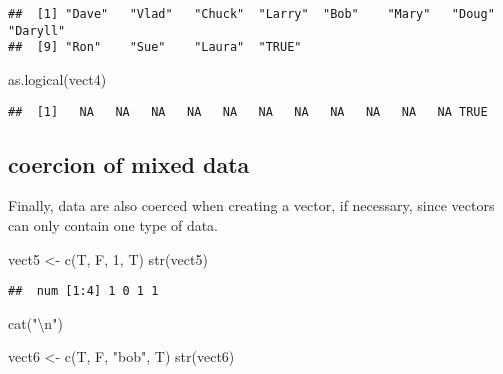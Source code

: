 \documentclass[
]{article}
\newenvironment{Shaded}{\begin{snugshade}}{\end{snugshade}}
\newcommand{\DecValTok}[1]{\textcolor[rgb]{0.00,0.00,0.81}{#1}}
\newcommand{\FunctionTok}[1]{\textcolor[rgb]{0.00,0.00,0.00}{#1}}
\newcommand{\NormalTok}[1]{#1}
\newcommand{\OtherTok}[1]{\textcolor[rgb]{0.56,0.35,0.01}{#1}}
\newcommand{\SpecialCharTok}[1]{\textcolor[rgb]{0.00,0.00,0.00}{#1}}
\newcommand{\StringTok}[1]{\textcolor[rgb]{0.31,0.60,0.02}{#1}}
\begin{document}
\begin{verbatim}
##  [1] "Dave"   "Vlad"   "Chuck"  "Larry"  "Bob"    "Mary"   "Doug"   "Daryll"
##  [9] "Ron"    "Sue"    "Laura"  "TRUE"
\end{verbatim}

\begin{Shaded}
\begin{Highlighting}[]
\FunctionTok{as.logical}\NormalTok{(vect4)}
\end{Highlighting}
\end{Shaded}

\begin{verbatim}
##  [1]   NA   NA   NA   NA   NA   NA   NA   NA   NA   NA   NA TRUE
\end{verbatim}

\hypertarget{coercion-of-mixed-data}{%
\subsection{coercion of mixed data}\label{coercion-of-mixed-data}}

Finally, data are also coerced when creating a vector, if necessary,
since vectors can only contain one type of data.

\begin{Shaded}
\begin{Highlighting}[]
\NormalTok{vect5 }\OtherTok{\textless{}{-}} \FunctionTok{c}\NormalTok{(T, F, }\DecValTok{1}\NormalTok{, T)}
\FunctionTok{str}\NormalTok{(vect5)}
\end{Highlighting}
\end{Shaded}

\begin{verbatim}
##  num [1:4] 1 0 1 1
\end{verbatim}

\begin{Shaded}
\begin{Highlighting}[]
\FunctionTok{cat}\NormalTok{(}\StringTok{"}\SpecialCharTok{\textbackslash{}n}\StringTok{"}\NormalTok{)}
\end{Highlighting}
\end{Shaded}

\begin{Shaded}
\begin{Highlighting}[]
\NormalTok{vect6 }\OtherTok{\textless{}{-}} \FunctionTok{c}\NormalTok{(T, F, }\StringTok{"bob"}\NormalTok{, T)}
\FunctionTok{str}\NormalTok{(vect6)}
\end{Highlighting}
\end{Shaded}
\end{document}
